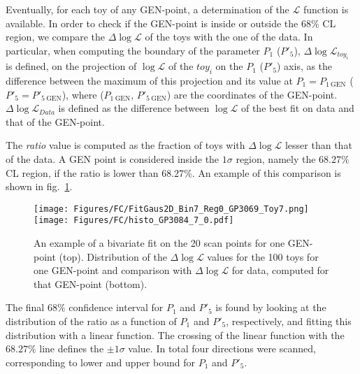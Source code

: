 Eventually, for each toy of any GEN-point, a determination of the $\mathcal{L}$ function is available.
In order to check if the GEN-point is inside or outside the $68\%$ CL region, we compare the $\Delta\log\mathcal{L}$ of the toys with the one of the data.
In particular, when computing the boundary of the parameter $P_1$ ($P'_5$), $\Delta\log\mathcal{L}_{toy_{i}}$ is defined, on the projection of $\log\mathcal{L}$ of the $toy_{i}$ on the $P_1$ ($P'_5$) axis, as the difference between the maximum of this projection and its value at $P_1=P_{1~\mathrm{GEN}}$ ($P'_5=P'_{5~\mathrm{GEN}}$), where ($P_{1~\mathrm{GEN}}$, $P'_{5~\mathrm{GEN}}$) are the coordinates of the GEN-point.
$\Delta\log\mathcal{L}_{Data}$ is defined as the difference between $\log\mathcal{L}$ of the best fit on data and that of the GEN-point.

The {\em ratio} value is computed as the fraction of toys with $\Delta\log\mathcal{L}$ lesser than that of the data.
A GEN point is considered inside the $1\sigma$ region, namely the $68.27\%$ CL region, if the ratio is lower than $68.27\%$.
An example of this comparison is shown in fig.~\ref{fig:ExampleFC}.

\begin{figure}[hbt]
  \centering
  \texttt{[image: Figures/FC/FitGaus2D\_Bin7\_Reg0\_GP3069\_Toy7.png]}\\
  \texttt{[image: Figures/FC/histo\_GP3084\_7\_0.pdf]}
  \caption{An example of a bivariate fit on the 20 scan points for one GEN-point (top).
    Distribution of the $\Delta\log\mathcal{L}$ values for the 100 toys for one GEN-point and comparison with $\Delta\log\mathcal{L}$ for data, computed for that GEN-point (bottom).}
  \label{fig:ExampleFC}
\end{figure}

The final $68\%$ confidence interval for $P_1$ and $P'_5$ is found by looking at the distribution of the ratio as a function of $P_1$ and $P'_5$, respectively, and fitting this distribution with a linear function.
The crossing of the linear function with the $68.27\%$ line defines the $\pm1\sigma$ value.
In total four directions were scanned, corresponding to lower and upper bound for $P_1$ and $P'_5$.

